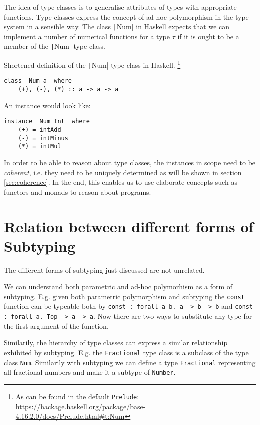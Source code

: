 The idea of type classes is to generalise attributes of types with appropriate functions.
Type classes express the concept of ad-hoc polymorphism in the type system in a sensible  way.
The class \texttt|Num| in Haskell expects that we can implement a number of numerical functions for a type $\tau$ if it is ought to be a member of the \texttt|Num| type class.

Shortened definition of the \texttt|Num| type class in Haskell.
\footnote{As can be found in the default \texttt{Prelude}: \url{https://hackage.haskell.org/package/base-4.16.2.0/docs/Prelude.html\#t:Num}}

\begin{verbatim}
class  Num a  where
    (+), (-), (*) :: a -> a -> a
\end{verbatim}

An instance would look like:

\begin{verbatim}
instance  Num Int  where
    (+) = intAdd
    (-) = intMinus
    (*) = intMul
\end{verbatim}


In order to be able to reason about type classes, the instances in scope need to be \emph{coherent}, i.e. they need to be uniquely determined as will be shown in section \ref{sec:coherence}.
In the end, this enables us to use elaborate concepts such as functors and monads to reason about programs.

\cite{wadlerblott}

\section{Relation between different forms of Subtyping}\label{sec:relations}

The different forms of subtyping just discussed are not unrelated.

We can understand both parametric and ad-hoc polymorhism as a form of subtyping.
E.g. given both parametric polymorphism and subtyping the \texttt{const} function can be typeable both by
\texttt{const : forall a b. a -> b -> b} and \texttt{const : forall a. Top -> a -> a}.
Now there are two ways to substitute any type for the first argument of the function.

Similarily, the hierarchy of type classes can express a similar relationship exhibited by subtyping.
E.g. the \texttt{Fractional} type class is a subclass of the type class \texttt{Num}.
Similarily with subtyping we can define a type \texttt{Fractional} representing all fractional numbers and make it a subtype of \texttt{Number}.

